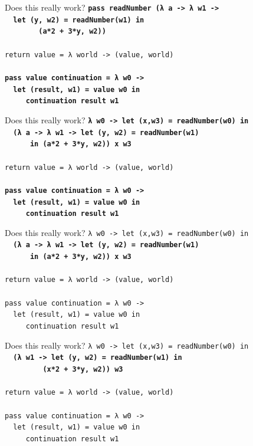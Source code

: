 \documentclass{beamer}
\begin{document}
\begin{frame}{Does this really work?}
  \texttt{\textbf{pass readNumber (λ a -> λ w1 ->\\
      \ \ let (y, w2) = readNumber(w1) in\\
      \ \ \ \ \ \ \ \ (a*2 + 3*y, w2))}\\
    \ \\
    return value = λ world -> (value, world) \\
    \ \\
    \textbf{pass value continuation = λ w0 -> \\
      \ \ let (result, w1) = value w0 in \\
      \ \ \ \ \ continuation result w1}
  }
\end{frame}

\begin{frame}{Does this really work?}
  \texttt{\textbf{λ w0 -> let (x,w3) = readNumber(w0) in\\
      \ \ (λ a -> λ w1 -> let (y, w2) = readNumber(w1) \\
      \ \ \ \ \ \ in (a*2 + 3*y, w2)) x w3}\\
    \ \\
    return value = λ world -> (value, world) \\
    \ \\
    \textbf{pass value continuation = λ w0 -> \\
      \ \ let (result, w1) = value w0 in \\
      \ \ \ \ \ continuation result w1}
  }
\end{frame}

\begin{frame}{Does this really work?}
  \texttt{λ w0 -> let (x,w3) = readNumber(w0) in\\
    \ \ \textbf{(λ a -> λ w1 -> let (y, w2) = readNumber(w1)\\
      \ \ \ \ \ \ in (a*2 + 3*y, w2)) x w3}\\
    \ \\
    return value = λ world -> (value, world) \\
    \ \\
    pass value continuation = λ w0 -> \\
    \ \ let (result, w1) = value w0 in \\
    \ \ \ \ \ continuation result w1
  }
\end{frame}

\begin{frame}{Does this really work?}
  \texttt{λ w0 -> let (x,w3) = readNumber(w0) in\\
    \ \ \textbf{(λ w1 -> let (y, w2) = readNumber(w1) in\\
      \ \ \ \ \ \ \ \ \ (x*2 + 3*y, w2)) w3}\\
    \ \\
    return value = λ world -> (value, world) \\
    \ \\
    pass value continuation = λ w0 -> \\
    \ \ let (result, w1) = value w0 in \\
    \ \ \ \ \ continuation result w1
  }
\end{frame}
\end{document}
